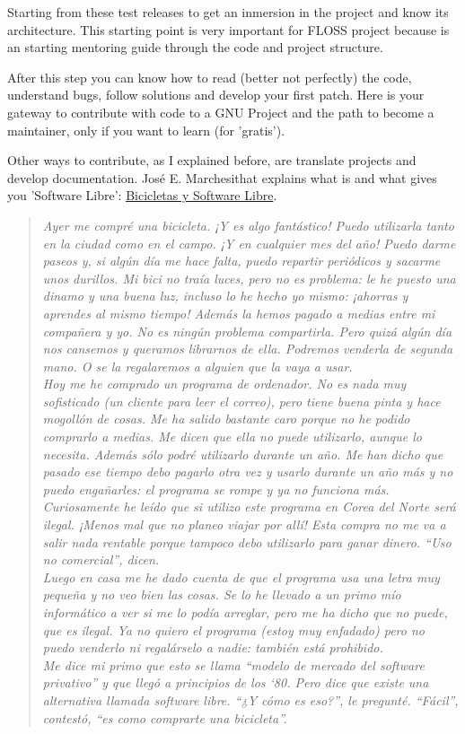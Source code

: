 \par Starting from these test releases to get an inmersion in the project and know its architecture. This starting point is very important for FLOSS project because is an starting mentoring guide through the code and project structure.

\par After this step you can know how to read (better not perfectly) the code, understand bugs, follow solutions and develop your first patch. Here is your gateway to contribute with code to a GNU Project and the path to become a maintainer, only if you want to learn (for 'gratis').

\par Other ways to contribute, as I explained before, are translate projects and develop documentation. Jos\'e E. Marchesithat explains what is and what gives you 'Software Libre': \href{http://es.gnu.org/~jemarch/bicicletas.html}{Bicicletas y Software Libre}.

\begin{quotation}
    \emph{Ayer me compr\'e una bicicleta. ¡Y es algo fant\'astico! Puedo utilizarla tanto en la ciudad como en el campo. ¡Y en cualquier mes del año! Puedo darme paseos y, si alg\'un d\'ia me hace falta, puedo repartir peri\'odicos y sacarme unos durillos. Mi bici no tra\'ia luces, pero no es problema: le he puesto una dinamo y una buena luz, incluso lo he hecho yo mismo: ¡ahorras y aprendes al mismo tiempo! Adem\'as la hemos pagado a medias entre mi compañera y yo. No es ning\'un problema compartirla. Pero quiz\'a alg\'un d\'ia nos cansemos y queramos librarnos de ella. Podremos venderla de segunda mano. O se la regalaremos a alguien que la vaya a usar.
    \\ Hoy me he comprado un programa de ordenador. No es nada muy sofisticado (un cliente para leer el correo), pero tiene buena pinta y hace mogoll\'on de cosas. Me ha salido bastante caro porque no he podido comprarlo a medias. Me dicen que ella no puede utilizarlo, aunque lo necesita. Adem\'as s\'olo podr\'e utilizarlo durante un año. Me han dicho que pasado ese tiempo debo pagarlo otra vez y usarlo durante un año m\'as y no puedo engañarles: el programa se rompe y ya no funciona m\'as. Curiosamente he le\'ido que si utilizo este programa en Corea del Norte ser\'a ilegal. ¡Menos mal que no planeo viajar por all\'i! Esta compra no me va a salir nada rentable porque tampoco debo utilizarlo para ganar dinero. “Uso no comercial”, dicen.
    \\ Luego en casa me he dado cuenta de que el programa usa una letra muy pequeña y no veo bien las cosas. Se lo he llevado a un primo m\'io inform\'atico a ver si me lo pod\'ia arreglar, pero me ha dicho que no puede, que es ilegal. Ya no quiero el programa (estoy muy enfadado) pero no puedo venderlo ni regal\'arselo a nadie: tambi\'en est\'a prohibido.
    \\ Me dice mi primo que esto se llama “modelo de mercado del software privativo” y que lleg\'o a principios de los ‘80. Pero dice que existe una alternativa llamada software libre. “¿Y c\'omo es eso?”, le pregunt\'e. “F\'acil”, contest\'o, “es como comprarte una bicicleta”.}
\end{quotation}

